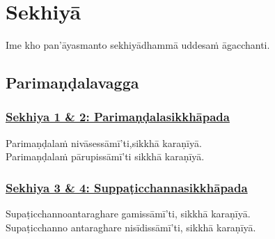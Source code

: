 
\section{Sekhiyā}
\label{sekh}

\begin{intro}
	Ime kho pan'āyasmanto sekhiyā\makeatletter\hyperlink{endnote469-appendix}\makeatother \thinspace dhammā uddesaṁ āgacchanti.
\end{intro}

\setsubsecheadstyle{\subsectionFmt}
\subsection{Parimaṇḍalavagga}

\subsubsection*{\hyperref[training1-2]{Sekhiya 1 \& 2: Parimaṇḍalasikkhāpada}}
\label{sekh1-2}

Parimaṇḍalaṁ nivāsessāmī'ti,\makeatletter\hyperlink{endnote470-appendix}\makeatother \thinspace sikkhā karaṇīyā.\makeatletter\hyperlink{endnote471-appendix}\makeatother \thinspace\\
Parimaṇḍalaṁ pārupissāmī'ti sikkhā karaṇīyā.



\subsubsection*{\hyperref[training3-4]{Sekhiya 3 \& 4: Suppaṭicchannasikkhāpada}}
\label{sekh3-4}

Supaṭicchanno\makeatletter\hyperlink{endnote472-appendix}\makeatother \thinspace antaraghare gamissāmī'ti, sikkhā karaṇīyā.\\
Supaṭicchanno antaraghare nisīdissāmī'ti, sikkhā karaṇīyā.



